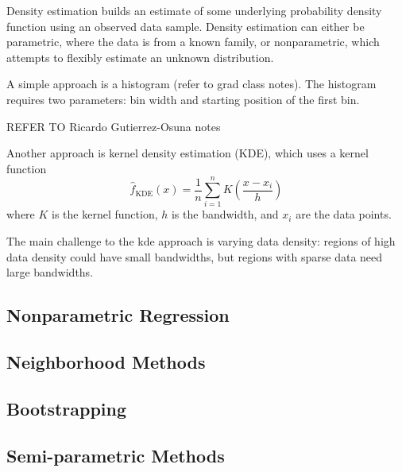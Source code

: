 \documentclass[
  letterpaper,
  DIV=11,
  numbers=noendperiod]{scrreprt}
\begin{document}
Density estimation builds an estimate of some underlying probability
density function using an observed data sample. Density estimation can
either be parametric, where the data is from a known family, or
nonparametric, which attempts to flexibly estimate an unknown
distribution.

A simple approach is a histogram (refer to grad class notes). The
histogram requires two parameters: bin width and starting position of
the first bin.

\begin{tcolorbox}[enhanced jigsaw, arc=.35mm, breakable, title=\textcolor{quarto-callout-note-color}{\faInfo}\hspace{0.5em}{Note}, coltitle=black, opacityback=0, bottomtitle=1mm, colback=white, left=2mm, opacitybacktitle=0.6, toptitle=1mm, colframe=quarto-callout-note-color-frame, leftrule=.75mm, titlerule=0mm, rightrule=.15mm, bottomrule=.15mm, colbacktitle=quarto-callout-note-color!10!white, toprule=.15mm]

REFER TO Ricardo Gutierrez-Osuna notes

\end{tcolorbox}

Another approach is kernel density estimation (KDE), which uses a kernel
function \[
\hat{f}_{\text{KDE}} (x) = \frac{1}{n} \sum_{i=1}^n K(\frac{x - x_i}{h})
\] where \(K\) is the kernel function, \(h\) is the bandwidth, and
\(x_i\) are the data points.

The main challenge to the kde approach is varying data density: regions
of high data density could have small bandwidths, but regions with
sparse data need large bandwidths.

\subsection{Nonparametric Regression}\label{nonparametric-regression}

\subsection{Neighborhood Methods}\label{neighborhood-methods}

\subsection{Bootstrapping}\label{bootstrapping}

\subsection{Semi-parametric Methods}\label{semi-parametric-methods}
\end{document}
